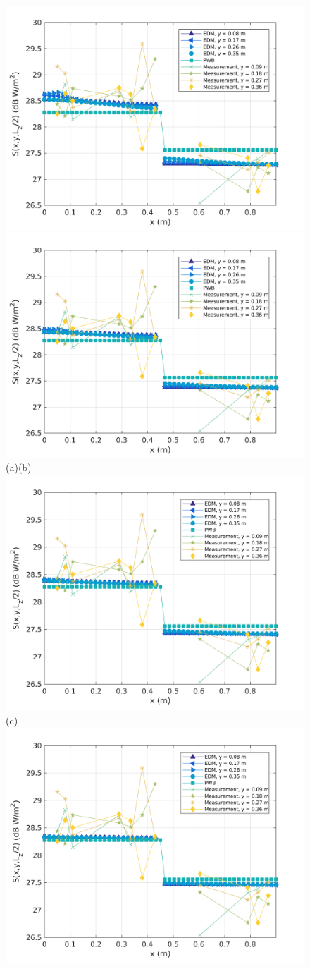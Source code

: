 \documentclass[a4paper]{article}
\numberwithin{equation}{section}
\begin{document}
\begin{figure}[ht]
\begin{center}
\includegraphics[width=0.49\linewidth]{figures/DDM-EEBC_3D_DU_PowerDensityProfileXMeas_JX_k0_5}
\includegraphics[width=0.49\linewidth]{figures/DDM-EEBC_3D_DU_PowerDensityProfileXMeas_JX_k0_75}\\
{\footnotesize (a)\hspace{75mm}(b)}\\
\includegraphics[width=0.5\linewidth]{figures/DDM-EEBC_3D_DU_PowerDensityProfileXMeas_JX_k1_0}\\
{\footnotesize (c)}\\
\includegraphics[width=0.49\linewidth]{figures/DDM-EEBC_3D_DU_PowerDensityProfileXMeas_JX_k1_5}

\end{center}
\end{figure}
\end{document}
